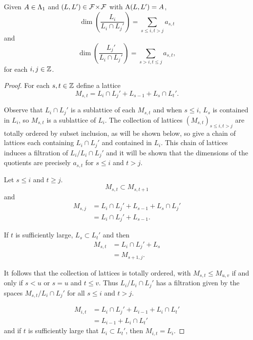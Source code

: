 \documentclass[a4paper, 11pt]{report}
\begin{document}
\begin{lemma}\label{lemma:hook-codimension-formula}
Given $A\in\Lambda_1{}$ and $(L,L')\in{\mathcal{F}\!\times\!\mathcal{F}}$ with $\operatorname{A}(L,L')=A$,
\begin{equation*}
\dim\left(\frac{L_i}{L_i\cap L_j'}\right) = \sum_{s\le i, t>j} a_{s,t}
\end{equation*}
and
\begin{equation*}
\dim\left(\frac{L_j'}{L_i\cap L_j'}\right) = \sum_{s>i,t\le j}a_{s,t},
\end{equation*}
for each $i,j\in\mathbb{Z}$.
\end{lemma}

\begin{proof}
For each $s,t\in\mathbb{Z}$ define a lattice
\begin{equation*}
M_{s,t} = L_i\cap L_j'+ L_{s-1} + L_s\cap L_t'.
\end{equation*}

Observe that $L_i\cap L_j'$ is a sublattice of each $M_{s,t}$ and when $s\le i$, $L_s$ is contained in $L_i$, so $M_{s,t}$ is a sublattice of $L_i$. The collection  of lattices ${(M_{s,t})}_{s\le i, t>j}$ are totally ordered by subset inclusion, as will be shown below, so give a chain of lattices each containing $L_i\cap L_j'$ and contained in $L_i$. This chain of lattices induces a filtration of $L_i/{L_i\cap L_j'}$ and it will be shown that the dimensions of the quotients are precisely $a_{s,t}$ for $s\le i$ and $t>j$.

Let $s\le i$ and $t\geq j$.
\begin{equation*}
M_{s,t}\subset M_{s,t+1}
\end{equation*}
and
\begin{align*}
M_{s,j}
&= L_i\cap L_j' + L_{s-1} +L_s\cap L_j'\\
&= L_i\cap L_j' + L_{s-1}.
\end{align*}

If $t$ is sufficiently large, $L_s\subset L_t'$ and then
\begin{align*}
M_{s,t}
&= L_i\cap L_j' + L_s\\
&= M_{s+1,j}.
\end{align*}

It follows that the collection of lattices is totally ordered, with $M_{s,t}\le M_{u,v}$ if and only if $s<u$ or $s=u$ and $t\le v$. Thus $L_i/{L_i\cap L_j'}$ has a filtration given by the spaces $M_{s,t}/{L_i\cap L_j'}$ for all $s\le i$ and $t>j$.

\begin{align*}
M_{i,t}
&= L_i\cap L_j' + L_{i-1} + L_i\cap L_t'\\
&= L_{i-1} + L_i\cap L_t'
\end{align*}
and if $t$ is sufficiently large that $L_i\subset L_t'$, then $M_{i,t}=L_i$.


\end{proof}
\end{document}
